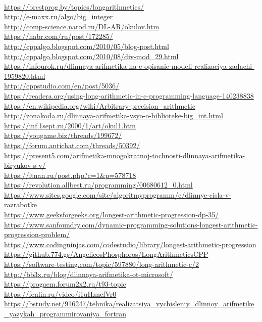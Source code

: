 \documentclass{article}
\begin{document}
\\
\url{https://brestprog.by/topics/longarithmetics/}\\
\url{http://e-maxx.ru/algo/big_integer}\\
\url{http://comp-science.narod.ru/DL-AR/okulov.htm}\\
\url{https://habr.com/ru/post/172285/}\\
\url{http://cppalgo.blogspot.com/2010/05/blog-post.html}\\
\url{http://cppalgo.blogspot.com/2010/08/div-mod_29.html}\\
\url{https://infourok.ru/dlinnaya-arifmetika-na-c-opisanie-modeli-realizaciya-zadachi-1959820.html}\\
\url{http://cppstudio.com/en/post/5036/}\\
\url{https://readera.org/using-long-arithmetic-in-c-programming-language-140238838}\\
\url{https://en.wikipedia.org/wiki/Arbitrary-precision_arithmetic}\\
\url{http://zonakoda.ru/dlinnaya-arifmetika-vsyo-o-biblioteke-big_int.html}\\
\url{https://inf.1sept.ru/2000/1/art/okul1.htm}\\
\url{https://yougame.biz/threads/199672/}\\
\url{https://forum.antichat.com/threads/50392/}\\
\url{https://present5.com/arifmetika-mnogokratnoj-tochnosti-dlinnaya-arifmetika-biryukov-s-v/}\\
\url{https://itnan.ru/post.php?c=1&p=578718}\\
\url{https://revolution.allbest.ru/programming/00680612_0.html}\\
\url{https://www.sites.google.com/site/algoritmyprogramm/c/dlinnye-cisla-v-razrabotke}\\
\url{https://www.geeksforgeeks.org/longest-arithmetic-progression-dp-35/}\\
\url{https://www.sanfoundry.com/dynamic-programming-solutions-longest-arithmetic-progression-problem/}\\
\url{https://www.codingninjas.com/codestudio/library/longest-arithmetic-progression}\\
\url{https://github.774.gs/AngelicosPhosphoros/LongArithmeticsCPP}\\
\url{https://software-testing.com/topic/597880/long-arithmetic-c/2}\\
\url{http://bb3x.ru/blog/dlinnaya-arifmetika-ot-microsoft/}\\
\url{https://progaem.forum2x2.ru/t93-topic}\\
\url{https://fenlin.ru/video/i1uHzncfVr0}\\
\url{https://bstudy.net/916247/tehnika/realizatsiya_vychisleniy_dlinnoy_arifmetike_yazykah_programmirovaniya_fortran}\\
\end{document}
